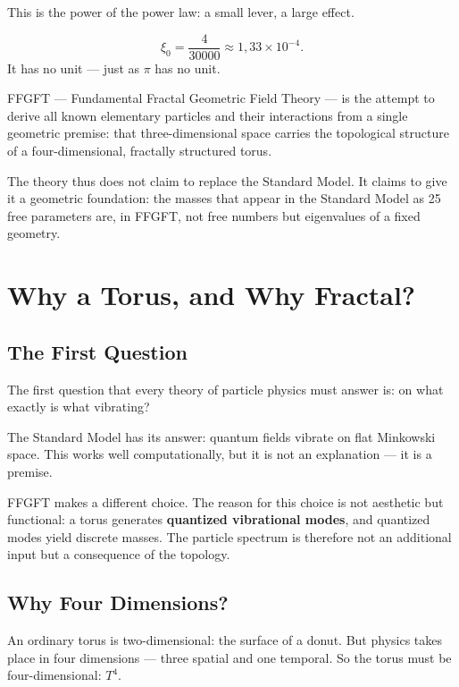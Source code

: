 \documentclass[12pt,oneside]{book}
\begin{document}
This is the power of the power law: a small lever, a large effect.

\begin{merkbox}
\[
\xi_0 = \frac{4}{30000} \approx 1{,}33 \times 10^{-4}.
\]
It has no unit --- just as $\pi$ has no unit.
\end{merkbox}

FFGFT --- Fundamental Fractal Geometric Field Theory --- is the attempt to derive all known elementary particles and their interactions from a single geometric premise: that three-dimensional space carries the topological structure of a four-dimen\-sional, fractally structured torus.

The theory thus does not claim to replace the Standard Model. It claims to give it a geometric foundation: the masses that appear in the Standard Model as 25 free parameters are, in FFGFT, not free numbers but eigenvalues of a fixed geometry.

\chapter{Why a Torus, and Why Fractal?}

\section{The First Question}

The first question that every theory of particle physics must answer is: on what exactly is what vibrating?

The Standard Model has its answer: quantum fields vibrate on flat Minkowski space. This works well computationally, but it is not an explanation --- it is a premise.

FFGFT makes a different choice. The reason for this choice is not aesthetic but functional: a torus generates \textbf{quantized vibrational modes}, and quantized modes yield discrete masses. The particle spectrum is therefore not an additional input but a consequence of the topology.

\section{Why Four Dimensions?}

An ordinary torus is two-dimensional: the surface of a donut. But physics takes place in four dimensions --- three spatial and one temporal. So the torus must be four-dimen\-sional: $T^4$.
\end{document}
